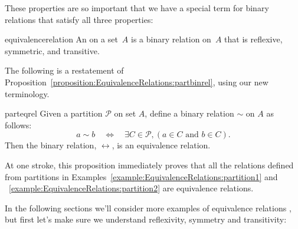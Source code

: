 These properties  are so important that we have a special term for binary relations that satisfy all three properties:

\begin{defn}{equivalencerelation}
An  on a set~$A$ is a binary relation on~$A$ that is reflexive, symmetric, and transitive.
\end{defn}

The following is a restatement of Proposition~\ref{proposition:EquivalenceRelations:partbinrel}, using our new terminology.

\begin{prop}{parteqrel} Given a partition $\mathcal{P}$ on set $A$, define a binary relation $\sim$ on $A$ as follows: 
\[a \sim b \quad \iff \quad \exists C \in \mathcal{P}, ( a \in C \text{ and } b \in C ).\]  
Then the binary relation, $\rel$, is an equivalence relation.
\end{prop}

At one stroke, this proposition immediately proves that all  the relations defined from partitions in Examples~\ref{example:EquivalenceRelations:partition1} and ~\ref{example:EquivalenceRelations:partition2} are equivalence relations.

In the following sections we'll consider more examples of equivalence relations , but first let's make sure we understand reflexivity, symmetry and transitivity:


